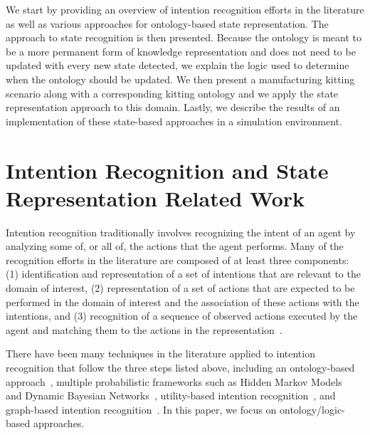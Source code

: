 \documentclass[preprint,12pt]{elsarticle}
\begin{document}
We start by providing an overview of intention recognition efforts in the literature as well as various approaches for ontology-based state representation. The approach to state recognition is then presented. Because the ontology is meant to be a more permanent form of knowledge representation and does not need to be updated with every new state detected, we explain the logic used to determine when the ontology should be updated. We then present a manufacturing kitting scenario along with a corresponding kitting ontology and we apply the state representation approach to this domain. Lastly, we describe the results of an implementation of these state-based approaches in a simulation environment.
\section{Intention Recognition and State Representation Related Work }\label{S:section1}
Intention recognition traditionally involves recognizing the intent of an agent by analyzing some of, or all of, the actions that the agent performs. Many of the recognition efforts in the literature are composed of at least three components: (1) identification and representation of a set of intentions that are relevant to the domain of interest, (2) representation of a set of actions that are expected to be performed in the domain of interest and the association of these actions with the intentions, and (3) recognition of a sequence of observed actions executed by the agent and matching them to the actions in the representation~\cite{SADRI.2011}.


There have been many techniques in the literature applied to intention recognition that follow the three steps listed above, including an ontology-based approach~\cite{JEON.ICMUE.2008}, multiple probabilistic frameworks such as  Hidden Markov Models~\cite{KELLEY.ICHRI.2008} and Dynamic Bayesian Networks~\cite{SCHREMPF.ICAR.2005}, utility-based intention recognition~\cite{MAO.AAMAS.2004}, and graph-based intention recognition~\cite{YOUN.IJASET.2008}. In this paper, we focus on ontology/logic-based approaches.
\end{document}
